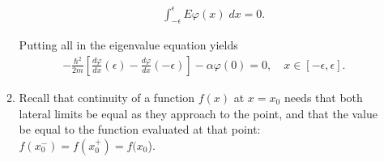 \documentclass[letterpaper,11pt,twoside]{article}
\begin{document}
\begin{enumerate}[itemsep=0pt,topsep=0pt,label=(\alph*)]
\begin{enumerate}[itemsep=0pt,topsep=0pt,label=(a.\arabic*)]
\begin{itemize}
      \begin{align*}
        \int_{-\epsilon}^\epsilon E\varphi(x)\;dx=0.
      \end{align*}
    \end{itemize}
    Putting all in the eigenvalue equation yields
    \begin{align}
      -\frac{\hbar^2}{2m}\left[\frac{d\varphi}{dx}(\epsilon)
        -\frac{d\varphi}{dx}(-\epsilon)\right]-\alpha\varphi(0)=0,\quad x\in[-\epsilon,\epsilon].
        \label{eq:inteigenvalueequation}
    \end{align}
    \item Recall that continuity of a function $f(x)$ at $x=x_0$ needs that both lateral limits be equal as they approach to the point, 
    and that the value be equal to the function evaluated at that point: $f(x_0^-)=f(x_0^+)=f(x_0$).


\end{enumerate}
\end{enumerate}
\end{document}
